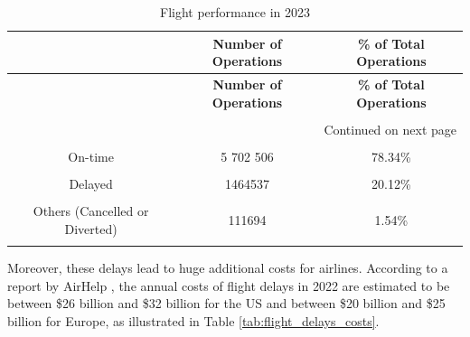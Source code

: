 \documentclass[12pt,oneside]{book} %
\begin{document}
\begin{longtable}{c c c}
\caption{Flight performance in 2023 \cite{BTS_flight_delays_statistics}}
\label{tab:flight_bts}  \\

\hline
  & \textbf{Number of Operations} & \textbf{\% of Total Operations} \\ \hline
\endfirsthead

\hline
 & \textbf{Number of Operations} & \textbf{\% of Total Operations} \\ \hline
\\
\endhead

\hline \multicolumn{3}{r}{{Continued on next page}} \\ \hline
\endfoot

\hline
\endlastfoot

& & 
\\
On-time
& 5 702 506
& 78.34\%
\\
& & 
\\
Delayed
& 1464537
& 20.12\%
\\
& &
\\
Others (Cancelled or Diverted)
& 111694
& 1.54\%
\\
& &
\\
\end{longtable}

\noindent Moreover, these delays lead to huge additional costs for airlines. According to a report by AirHelp \cite{AirHelp}, the annual costs of flight delays in 2022 are estimated to be between \$26 billion and \$32 billion for the US and between \$20 billion and \$25 billion for Europe, as illustrated in Table \ref{tab:flight_delays_costs}.
\end{document}
